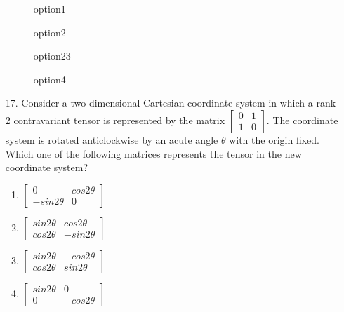 \documentclass[journal]{IEEEtran}
\begin{document}
\begin{enumerate}
\begin{figure}[!ht]
        \centering
        \caption{option1}
    \end{figure}
    \begin{figure}[!ht]
        \centering
        \caption{option2}
    \end{figure}
    \begin{figure}[!ht]
        \centering
        \caption{option23}
    \end{figure}
    \begin{figure}[!ht]
        \centering
        \caption{option4}
    \end{figure}
    \item[17.] Consider a two dimensional Cartesian coordinate system in which a rank 2
    contravariant tensor is represented by the matrix $\begin{bmatrix}0&1\\1&0\end{bmatrix}$. The coordinate system
    is rotated anticlockwise by an acute angle $\theta$ with the origin fixed. Which one of
    the following matrices represents the tensor in the new coordinate system?
    \begin{enumerate}[label = (\Alph*)]
        \item $\begin{bmatrix}0&cos2\theta\\-sin2\theta&0\end{bmatrix}$
        \item $\begin{bmatrix}sin2\theta&cos2\theta\\cos2\theta&-sin2\theta\end{bmatrix}$
        \item $\begin{bmatrix}sin2\theta&-cos2\theta\\cos2\theta&sin2\theta\end{bmatrix}$
        \item $\begin{bmatrix}sin2\theta&0\\0&-cos2\theta\end{bmatrix}$
    \end{enumerate}

\end{enumerate}
\end{document}
